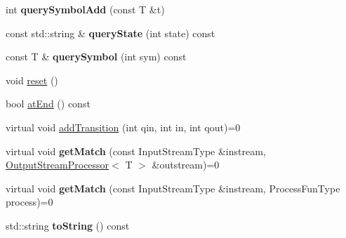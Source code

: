 \begin{DoxyCompactItemize}
\item 
\mbox{\label{classx2_1_1_finite_automata_a36bd258d031bea1d3e31dbc674047c51}} 
int {\bfseries query\+Symbol\+Add} (const T \&t)
\item 
\mbox{\label{classx2_1_1_finite_automata_a96ed2d1841cde70fb1d7d51a62fbb2e4}} 
const std\+::string \& {\bfseries query\+State} (int state) const
\item 
\mbox{\label{classx2_1_1_finite_automata_a2fb9ac68cd1c068b1ccb56d54ba04181}} 
const T \& {\bfseries query\+Symbol} (int sym) const
\item 
void \hyperlink{classx2_1_1_finite_automata_ab645c9a82ae95bda44e60dce1568bcad}{reset} ()
\item 
bool \hyperlink{classx2_1_1_finite_automata_a993fb22633638494c8a267cd2c5329fc}{at\+End} () const
\item 
virtual void \hyperlink{classx2_1_1_finite_automata_ac8f011bb86cb9e47370274ae200fc769}{add\+Transition} (int qin, int in, int qout)=0
\item 
\mbox{\label{classx2_1_1_finite_automata_a0a6920e26afbb6ec5f3ead1803cf132a}} 
virtual void {\bfseries get\+Match} (const Input\+Stream\+Type \&instream, \hyperlink{classx2_1_1_output_stream_processor}{Output\+Stream\+Processor}$<$ T $>$ \&outstream)=0
\item 
\mbox{\label{classx2_1_1_finite_automata_a0cdcee5c903196276d63e6befd3608f5}} 
virtual void {\bfseries get\+Match} (const Input\+Stream\+Type \&instream, Process\+Fun\+Type process)=0
\item 
\mbox{\label{classx2_1_1_finite_automata_a08657406175592e9312e6f6a7609b14d}} 
std\+::string {\bfseries to\+String} () const
\end{DoxyCompactItemize}
